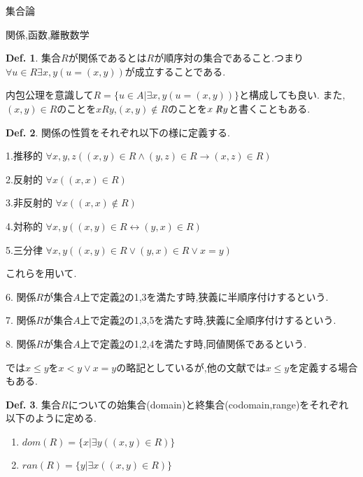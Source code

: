 \documentclass[14pt]{jsarticle}
\theoremstyle{definition}
\newtheorem{dfn}{Def.}[subsection]
\begin{document}
\begin{section}{集合論}
\clearpage
\begin{subsection}{関係,函数,離散数学}
\begin{dfn}
\label{relationdef}
集合$R$が関係であるとは$R$が順序対の集合であること.つまり$\forall u \in R \exists x,y (u=(x,y))$が成立することである.
\end{dfn}
内包公理を意識して$R=\{u\in A|\exists x,y(u=(x,y))\}$と構成しても良い.
また,$(x,y) \in R$のことを$xRy$,$(x,y) \not \in R$のことを$x\not \hspace{-3.0pt}R y$と書くこともある.
\begin{dfn}
\label{relationprop}
関係の性質をそれぞれ以下の様に定義する.
\begin{description}
	\item{1.推移的} \hspace{9.0pt}$\forall x,y,z ((x,y) \in R \land (y,z) \in R \to (x,z) \in R)$
	\item{2.反射的} \hspace{9.0pt}$\forall x ((x,x) \in R)$
	\item{3.非反射的} $\forall x((x,x)\not \in R)$
	\item{4.対称的} \hspace{9.0pt}$\forall x,y ((x,y)\in R \leftrightarrow (y,x)\in R)$
	\item{5.三分律} \hspace{9.0pt}$\forall x,y( (x,y) \in R \lor (y,x) \in R \lor x=y)$
\end{description}
これらを用いて.
\begin{description}
	\item{6.} 関係$R$が集合$A$上で定義\ref{relationprop}の1,3を満たす時,狭義に半順序付けするという.
	\item{7.} 関係$R$が集合$A$上で定義\ref{relationprop}の1,3,5を満たす時,狭義に全順序付けするという.
	\item{8.} 関係$R$が集合$A$上で定義\ref{relationprop}の1,2,4を満たす時,同値関係であるという.
\end{description}
\end{dfn}
	\cite{Kunen}では$x \leq y$を$x < y \lor x=y$の略記としているが,他の文献では$x \leq y$を定義する場合もある.
\begin{dfn}
\label{domrandef}
	集合$R$についての始集合(domain)と終集合(codomain,range)をそれぞれ以下のように定める.
\begin{enumerate}
	\item $dom(R)=\{x|\exists y((x,y)\in R)\}$
	\item $ran(R)=\{y|\exists x((x,y)\in R)\}$
\end{enumerate}

\end{dfn}
\end{subsection}
\end{section}
\end{document}

